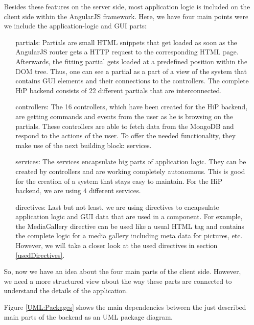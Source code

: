 Besides these features on the server side, most application logic is included on the client side within the AngularJS framework. Here, we have four main points were we include the application-logic and \ac{GUI} parts:

\begin{itemize}
	\item[partials:] Partials are small \ac{HTML} snippets that get loaded as soon as the AngularJS router gets a \ac{HTTP} request to the corresponding \ac{HTML} page. Afterwards, the fitting partial gets loaded at a predefined position within the \ac{DOM} tree. Thus, one can see a partial as a part of a view of the system that contains \ac{GUI} elements and their connections to the controllers.  The complete \ac{HiP} backend consists of 22 different partials that are interconnected.  
	\item[controllers:] The 16 controllers, which have been created for the \ac{HiP} backend, are getting commands and events from the user as he is browsing on the partials. These controllers are able to fetch data from the MongoDB and respond to the actions of the user. To offer the needed functionality, they make use of the next building block: services.  
	\item[services:] The services encapsulate big parts of application logic. They can be created by controllers and are working completely autonomous. This is good for the creation of a system that stays easy to maintain. For the \ac{HiP} backend, we are using 4 different services.
	\item[directives:] Last but not least, we are using directives to encapsulate application logic and \ac{GUI} data that are used in a component. For example, the MediaGallery directive can be used like a usual \ac{HTML} tag and contains the complete logic for a media gallery including meta data for pictures, etc. However, we will take a closer look at the used directives in section \ref{usedDirectives}.
\end{itemize}

So, now we have an idea about the four main parts of the client side. 
However, we need a more structured view about the way these parts are connected to understand the details of the application. 

Figure \ref{UML:Packages} shows the main dependencies between the just described main parts of the backend as an \ac{UML} package diagram. 

